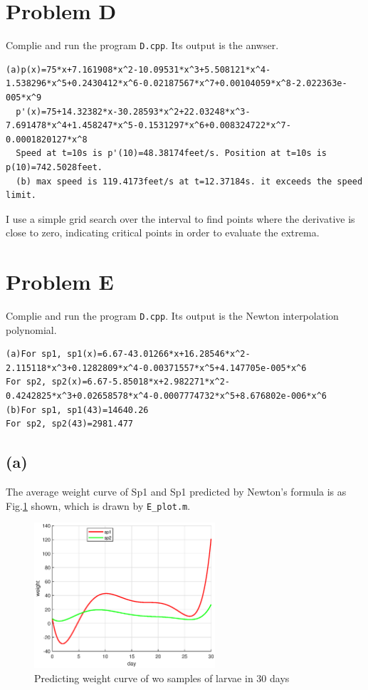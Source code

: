 \documentclass[a4paper]{article}
\begin{document}
\section*{Problem D}
Complie and run the program \verb|D.cpp|. Its output is the anwser. 
\begin{lstlisting}[breaklines=true]
  (a)p(x)=75*x+7.161908*x^2-10.09531*x^3+5.508121*x^4-1.538296*x^5+0.2430412*x^6-0.02187567*x^7+0.00104059*x^8-2.022363e-005*x^9
  p'(x)=75+14.32382*x-30.28593*x^2+22.03248*x^3-7.691478*x^4+1.458247*x^5-0.1531297*x^6+0.008324722*x^7-0.0001820127*x^8
  Speed at t=10s is p'(10)=48.38174feet/s. Position at t=10s is p(10)=742.5028feet.
  (b) max speed is 119.4173feet/s at t=12.37184s. it exceeds the speed limit.
  \end{lstlisting}

I use a simple grid search over the interval to find 
points where the derivative is close to zero, indicating critical points in order to evaluate the extrema.


\section*{Problem E}
Complie and run the program \verb|D.cpp|. Its output is the Newton interpolation polynomial.
\begin{lstlisting}[breaklines=true]
(a)For sp1, sp1(x)=6.67-43.01266*x+16.28546*x^2-2.115118*x^3+0.1282809*x^4-0.00371557*x^5+4.147705e-005*x^6
For sp2, sp2(x)=6.67-5.85018*x+2.982271*x^2-0.4242825*x^3+0.02658578*x^4-0.0007774732*x^5+8.676802e-006*x^6
(b)For sp1, sp1(43)=14640.26
For sp2, sp2(43)=2981.477
\end{lstlisting}
\subsection*{(a)}
The average weight curve of Sp1 and Sp1 predicted by Newton's formula is as Fig.\ref{fig3} shown, which is drawn by \verb|E_plot.m|.
\begin{figure}[htbp]
  \centering
  \includegraphics[width=0.6\textwidth]{images/E_pic.eps}  
  \renewcommand{\figurename}{Fig.}
  \caption{Predicting weight curve of wo samples of larvae in 30 days}
  \label{fig3}
\end{figure}
\end{document}
